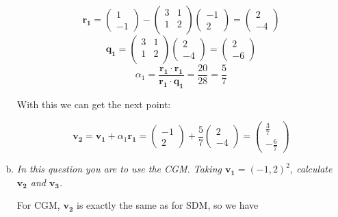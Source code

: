 \documentclass{article}
\let\vec\mathbf
\begin{document}
\begin{enumerate}[(a)]
    \[
      \vec{r_1} =
      \begin{pmatrix}
        1 \\ -1
      \end{pmatrix}
      -
      \begin{pmatrix}
        3 & 1 \\ 1 & 2 \\
      \end{pmatrix}
      \begin{pmatrix}
        -1 \\ 2
      \end{pmatrix}
      = 
      \begin{pmatrix}
        2 \\ -4
      \end{pmatrix}
    \]
    \[
      \vec{q_1} =
      \begin{pmatrix}
        3 & 1 \\ 1 & 2 \\
      \end{pmatrix}
      \begin{pmatrix}
         2 \\ -4
      \end{pmatrix}
      = 
      \begin{pmatrix}
        2 \\ -6
      \end{pmatrix}
    \]
    \[
      \alpha_1 = \frac{\vec{r_1} \cdot \vec{r_1}}{\vec{r_1} \cdot \vec{q_1}} = \frac{20}{28} = \frac{5}{7}
    \]

    With this we can get the next point:
    
    \[
      \vec{v_2} = \vec{v_1} + \alpha_1 \vec{r_1} =
      \begin{pmatrix}
        -1 \\ 2
      \end{pmatrix}
      + \frac{5}{7}
      \begin{pmatrix}
        2 \\ -4
      \end{pmatrix}
      =
      \begin{pmatrix}
        \frac{3}{7} \\ -\frac{6}{7}
      \end{pmatrix}
    \]

  \item \textit{In this question you are to use the CGM. Taking $\vec{v_1} = (-1,2)^2$, calculate $\vec{v_2}$ and $\vec{v_3}$.}

    For CGM, $\vec{v_2}$ is exactly the same as for SDM, so we have 


\end{enumerate}
\end{document}
